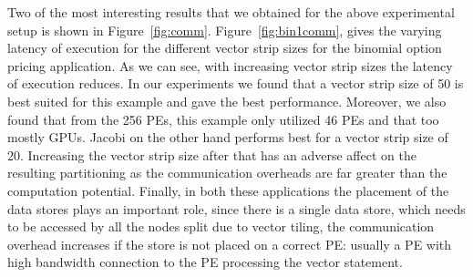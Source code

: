 Two of the most interesting results that we obtained for the above
experimental setup is shown in
Figure~\ref{fig:comm}. Figure~\ref{fig:bin1comm}, gives the varying
latency of execution for the different vector strip sizes for the
binomial option pricing application. As we can see, with increasing
vector strip sizes the latency of execution reduces. In our experiments
we found that a vector strip size of 50 is best suited for this example
and gave the best performance. Moreover, we also found that from the 256
PEs, this example only utilized 46 PEs and that too mostly GPUs.  Jacobi
on the other hand performs best for a vector strip size of
20. Increasing the vector strip size after that has an adverse affect on
the resulting partitioning as the communication overheads are far
greater than the computation potential. Finally, in both these
applications the placement of the data stores plays an important role,
since there is a single data store, which needs to be accessed by all
the nodes split due to vector tiling, the communication overhead
increases if the store is not placed on a correct PE: usually a PE with
high bandwidth connection to the PE processing the vector statement.

